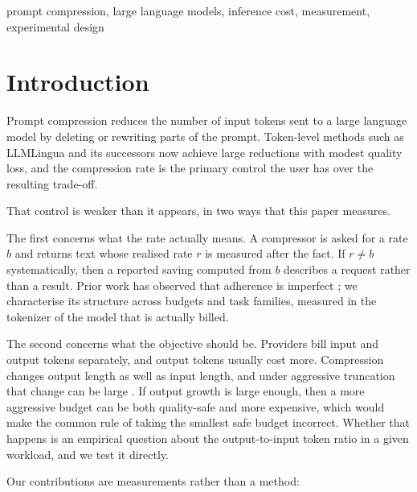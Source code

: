 \documentclass[conference]{IEEEtran}
\begin{document}
\begin{IEEEkeywords}
prompt compression, large language models, inference cost, measurement,
experimental design
\end{IEEEkeywords}

\section{Introduction}

Prompt compression reduces the number of input tokens sent to a large language
model by deleting or rewriting parts of the prompt. Token-level methods such
as LLMLingua \cite{jiang2023llmlingua} and its successors
\cite{jiang2024longllmlingua,pan2024llmlingua2} now achieve large reductions
with modest quality loss, and the compression rate is the primary control the
user has over the resulting trade-off.

That control is weaker than it appears, in two ways that this paper measures.

The first concerns what the rate actually means. A compressor is asked for a
rate $b$ and returns text whose realised rate $r$ is measured after the fact.
If $r \neq b$ systematically, then a reported saving computed from $b$
describes a request rather than a result. Prior work has observed that
adherence is imperfect \cite{kummer2026wild}; we characterise its structure
across budgets and task families, measured in the tokenizer of the model that
is actually billed.

The second concerns what the objective should be. Providers bill input and
output tokens separately, and output tokens usually cost more. Compression
changes output length as well as input length, and under aggressive truncation
that change can be large \cite{johnson2026method}. If output growth is large
enough, then a more aggressive budget can be both quality-safe and more
expensive, which would make the common rule of taking the smallest safe budget
incorrect. Whether that happens is an empirical question about the
output-to-input token ratio in a given workload, and we test it directly.

Our contributions are measurements rather than a method:
\end{document}
